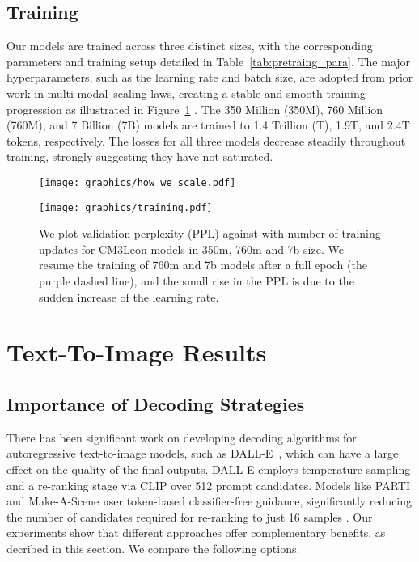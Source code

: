 \documentclass{article}
\newcommand{\model}{CM3Leon}
\newcommand{\mm}{multi-modal}
\begin{document}
\subsection{Training}
Our models are trained across three distinct sizes, with the corresponding parameters and training setup detailed in Table~\ref{tab:pretraing_para}. The major hyperparameters, such as the learning rate and batch size, are adopted from prior work in \mm\ scaling laws, creating a stable and smooth training progression as illustrated in Figure~\ref{fig:training_curve} \citep{mm_scaling_laws}.
The 350 Million (350M), 760 Million (760M), and 7 Billion (7B) models are trained to 1.4 Trillion (T), 1.9T, and 2.4T tokens, respectively. The losses for all three models decrease steadily throughout training, strongly suggesting they have not saturated. 


\begin{figure}[htbp]
  \centering
  \begin{minipage}[b]{0.48\textwidth}
    \centering
    \texttt{[image: graphics/how\_we\_scale.pdf]}
    \caption{We plot FID score in log scale of various models against the equivalent A100 GPU hours during training. \model{} scales better than DALLE~\citep{DALLE}, stable diffusion~(SD)~\citep{LDM} and PARTI~\citep{PARTI} models. }
  \label{fig:how_we_scale}
  \end{minipage}
  \hfill
  \begin{minipage}[b]{0.50\textwidth}
    \centering
\texttt{[image: graphics/training.pdf]}
    \caption{We plot validation perplexity (PPL) against with number of training updates for CM3Leon models in 350m, 760m and 7b size. We resume the training of 760m and 7b models after a full epoch (the purple dashed line), and the small rise in the PPL is due to the sudden increase of the learning rate.}
    \label{fig:training_curve}
  \end{minipage}
\end{figure}

\section{Text-To-Image Results}

\subsection{Importance of Decoding Strategies}
\label{sec:decoding}
There has been significant work on developing decoding algorithms for autoregressive text-to-image models, such as DALL-E~\citet{DALLE}, which can have a large effect on the quality of the final outputs. DALL-E employs temperature sampling and a re-ranking stage via CLIP over 512 prompt candidates. Models like PARTI and Make-A-Scene user token-based classifier-free guidance, significantly reducing the number of candidates required for re-ranking to just 16 samples \citep{PARTI, make_a_scene}. Our experiments show that different approaches offer complementary benefits, as decribed in this section. We compare the following options.
\end{document}
